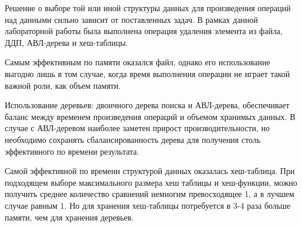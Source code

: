 \Conclusion

Решение о выборе той или иной структуры данных для произведения операций над данными сильно зависит от поставленных задач. В рамках данной лабораторной работы была выполнена операция удаления элемента из файла, ДДП, АВЛ-дерева и хеш-таблицы.

Самым эффективным по памяти оказался файл, однако его использование выгодно лишь в том случае, когда время выполнения операции не играет такой важной роли, как объем памяти.

Использование деревьев: двоичного дерева поиска и АВЛ-дерева, обеспечивает баланс между временем произведения операций и объемом хранимых данных. В случае с АВЛ-деревом наиболее заметен прирост производительности, но необходимо сохранять сбалансированность дерева для получения столь эффективного по времени результата.

Самой эффективной по времени структурой данных оказалась хеш-таблица. При подходящем выборе максимального размера хеш таблицы и хеш-функции, можно получить среднее количество сравнений немногим превосходящее 1, а в лучшем случае равным 1. Но для хранения хеш-таблицы потребуется в 3-4 раза больше памяти, чем для хранения деревьев.